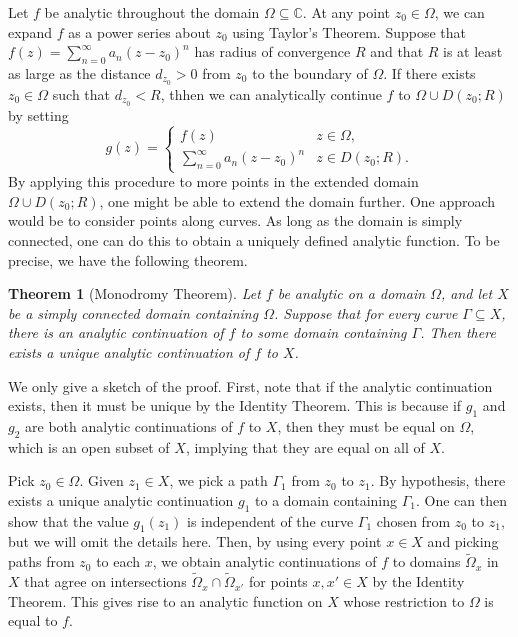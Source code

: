 \documentclass[10pt]{article}
\makeatletter
\newcommand{\C}{\mathbb{C}}
\theoremstyle{newstyle}
\newtheorem{thm}{Theorem}[section]
\newenvironment{pf}[1][\proofname]{\par
  \pushQED{\qed}%
  \normalfont \topsep0\p@\relax
  \trivlist
  \item[\hskip\labelsep\scshape
  #1\@addpunct{.}]\ignorespaces
}{%
  \popQED\endtrivlist\@endpefalse
}
\makeatother
\begin{document}
Let $f$ be analytic throughout the domain $\Omega \subseteq \C$. At any point $z_0 \in \Omega$, 
we can expand $f$ as a power series about $z_0$ using Taylor's Theorem. Suppose that 
$f(z) = \sum_{n=0}^\infty a_n(z-z_0)^n$ has radius of convergence $R$ and that $R$ is 
at least as large as the distance $d_{z_0} > 0$ from $z_0$ to the boundary of $\Omega$. 
If there exists $z_0 \in \Omega$ such that $d_{z_0} < R$, thhen we can analytically continue $f$ 
to $\Omega \cup D(z_0; R)$ by setting 
\[ g(z) = \begin{cases} f(z) & z \in \Omega, \\ 
\sum_{n=0}^\infty a_n(z-z_0)^n & z \in D(z_0; R). \end{cases} \]
By applying this procedure to more points in the extended domain $\Omega \cup D(z_0; R)$, 
one might be able to extend the domain further. One approach would be to consider 
points along curves. As long as the domain is simply connected, one can do this to obtain a uniquely 
defined analytic function. To be precise, we have the following theorem. 

\begin{thm}[Monodromy Theorem]
Let $f$ be analytic on a domain $\Omega$, and let $X$ be a simply connected domain containing $\Omega$. 
Suppose that for every curve $\Gamma \subseteq X$, there is an analytic continuation of $f$ to 
some domain containing $\Gamma$. Then there exists a unique analytic continuation of $f$ to $X$. 
\end{thm}
\begin{pf}
We only give a sketch of the proof. First, note that if the analytic continuation exists, then 
it must be unique by the Identity Theorem. This is because if $g_1$ and $g_2$ are both analytic 
continuations of $f$ to $X$, then they must be equal on $\Omega$, which is an open subset of $X$, 
implying that they are equal on all of $X$. 

Pick $z_0 \in \Omega$. Given $z_1 \in X$, we pick a path $\Gamma_1$ from $z_0$ to $z_1$. 
By hypothesis, there exists a unique analytic continuation $g_1$ to a domain containing $\Gamma_1$. 
One can then show that the value $g_1(z_1)$ is independent of the curve $\Gamma_1$ chosen from 
$z_0$ to $z_1$, but we will omit the details here. Then, by using every point $x \in X$ and 
picking paths from $z_0$ to each $x$, we obtain analytic continuations of $f$ to 
domains $\tilde\Omega_x$ in $X$ that agree on intersections $\tilde\Omega_x \cap 
\tilde\Omega_{x'}$ for points $x, x' \in X$ by the Identity Theorem. This gives rise to an analytic
function on $X$ whose restriction to $\Omega$ is equal to $f$. 
\end{pf}
\end{document}
